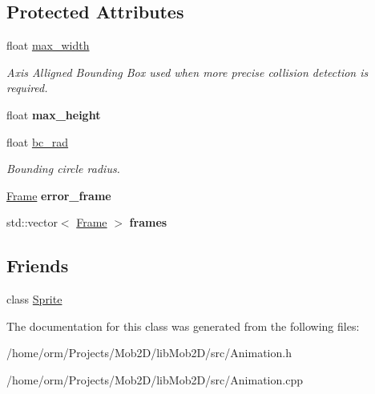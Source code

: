 \subsection*{Protected Attributes}
\begin{DoxyCompactItemize}
\item 
\hypertarget{classAnimation_a09be9c85379076d1f65bdbeefa8323ab}{
float \hyperlink{classAnimation_a09be9c85379076d1f65bdbeefa8323ab}{max\_\-width}}
\label{classAnimation_a09be9c85379076d1f65bdbeefa8323ab}

\begin{DoxyCompactList}\small\item\em Axis Alligned Bounding Box used when more precise collision detection is required. \item\end{DoxyCompactList}\item 
\hypertarget{classAnimation_a3b7536d50bd576233df45053ecc34fce}{
float {\bfseries max\_\-height}}
\label{classAnimation_a3b7536d50bd576233df45053ecc34fce}

\item 
\hypertarget{classAnimation_add25661ee234a199dfd4348a0fed7e0a}{
float \hyperlink{classAnimation_add25661ee234a199dfd4348a0fed7e0a}{bc\_\-rad}}
\label{classAnimation_add25661ee234a199dfd4348a0fed7e0a}

\begin{DoxyCompactList}\small\item\em Bounding circle radius. \item\end{DoxyCompactList}\item 
\hypertarget{classAnimation_a0a16c953e723fa5ecd3d73ab0d92119d}{
\hyperlink{structFrame}{Frame} {\bfseries error\_\-frame}}
\label{classAnimation_a0a16c953e723fa5ecd3d73ab0d92119d}

\item 
\hypertarget{classAnimation_a6b5206eee8cc91ba5d2fad8dc0918fa6}{
std::vector$<$ \hyperlink{structFrame}{Frame} $>$ {\bfseries frames}}
\label{classAnimation_a6b5206eee8cc91ba5d2fad8dc0918fa6}

\end{DoxyCompactItemize}
\subsection*{Friends}
\begin{DoxyCompactItemize}
\item 
\hypertarget{classAnimation_a3292175d54d93d126ba2829249316344}{
class \hyperlink{classAnimation_a3292175d54d93d126ba2829249316344}{Sprite}}
\label{classAnimation_a3292175d54d93d126ba2829249316344}

\end{DoxyCompactItemize}


The documentation for this class was generated from the following files:\begin{DoxyCompactItemize}
\item 
/home/orm/Projects/Mob2D/libMob2D/src/Animation.h\item 
/home/orm/Projects/Mob2D/libMob2D/src/Animation.cpp\end{DoxyCompactItemize}
